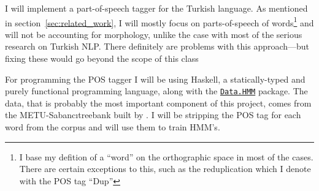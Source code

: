 \documentclass{article}
\newcommand{\hmmURL}{https://hackage.haskell.org/package/hmm-0.2.1.1/docs/Data-HMM.html}
\begin{document}
I will implement a part-of-speech tagger for the Turkish language. As
mentioned in section~\ref{sec:related_work}, I will mostly focus on parts-of-speech
of words\footnote{I base my defition of a ``word'' on the orthographic space in
  most of the cases. There are certain exceptions to this, such as the
  reduplication which I denote with the POS tag ``Dup''} and will not be accounting for morphology, unlike
the case with most of the serious research on Turkish NLP. There definitely are
problems with this approach---but fixing these would go beyond the scope of
this class

For programming the POS tagger I will be using Haskell, a statically-typed and purely
functional programming language, along with the
\href{\hmmURL}{\texttt{Data.HMM}} package.
The data, that is probably the most important component of this
project, comes from the METU-Sabanc\i treebank built by
\citet{oflazer2003building}.  I will be stripping the POS tag for each word from
the corpus and will use them to train HMM's.



\end{document}
